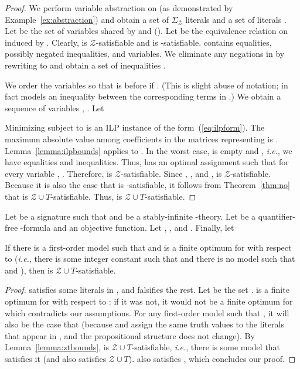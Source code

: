 \documentclass{llncs}
\newcommand{\ie}[0]{\emph{i.e.}, }
\newcommand{\Z}[0]{\ensuremath{\mathcal{Z}}}
\newcommand{\ZT}[0]{\ensuremath{\mathcal{Z} \cup T}}
\newcommand{\SigmaZ}[0]{\ensuremath{\Sigma_{\mathcal{Z}}}}
\begin{document}
\begin{proof}
  We perform variable abstraction on  (as demonstrated by
  Example~\ref{ex:abstraction}) and obtain a set of \SigmaZ{} literals
   and a set of  literals .  Let  be the set of
  variables shared by  and  (). Let  be the equivalence relation on  induced by
  . Clearly,  is \Z{}-satisfiable and  is -satisfiable.   contains 
  equalities,  possibly negated inequalities, and
   variables. We eliminate any negations in
   by rewriting  to  and obtain
  a set of inequalities .

  We order the variables  so that  is before  if . (This is slight abuse of notation;  in fact models an
  inequality between the corresponding terms in .) We obtain a
  sequence of variables , . Let
  

  Minimizing  subject to  is an ILP
  instance  of the form~(\ref{eq:ilpform}). The maximum absolute
  value among coefficients in the matrices representing  is
  . Lemma~\ref{lemma:ilpbounds} applies to . In the worst
  case,  is empty and ,
  \ie we have  equalities and  inequalities. Thus, 
  has an optimal assignment  such that for every variable ,
  . Therefore,  is \Z{}-satisfiable. Since
  , , and
  ,  is \Z{}-satisfiable. Because it is
  also the case that  is -satisfiable, it
  follows from Theorem~\ref{thm:no} that  is \ZT{}-satisfiable. Thus,  is \ZT{}-satisfiable.
\end{proof}

\begin{theorem}
  \label{thm:ztbounds}
  Let  be a signature such that  and  be a stably-infinite -theory. Let  be
  a quantifier-free -formula and  an objective
  function. Let , , and . Finally, let
  
  If there is a first-order model  such that  and  is a finite optimum for  with respect to
   (\ie there is some integer constant  such that  and there is no model  such that  and ), then  is \ZT{}-satisfiable.
\end{theorem}
\begin{proof}
   satisfies some literals in , and falsifies the rest. Let 
  be the set . 
  is a finite optimum for  with respect to : if it was not, it
  would not be a finite optimum for  which contradicts our
  assumptions. For any first-order model  such that , it will also be the case that  (because  and  assign the same truth
  values to the literals that appear in , and the propositional
  structure does not change). By Lemma~\ref{lemma:ztbounds},  is \ZT{}-satisfiable, \ie there is
  some model  that satisfies it (and also satisfies \ZT{}). 
  also satisfies , which
  concludes our proof.
\end{proof}
\end{document}
